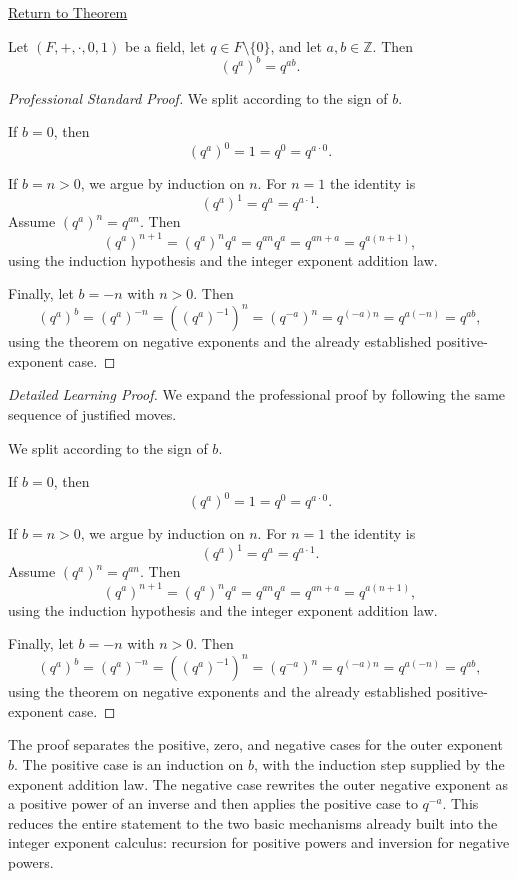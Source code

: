 \newpage
{}
\label{prf:power-of-a-power-in-field}

\begin{remark*}[Return]
\hyperref[thm:power-of-a-power-in-field]{Return to Theorem}
\end{remark*}

\begin{theorem*}
Let $(F,+,\cdot,0,1)$ be a field, let $q\in F\setminus\{0\}$, and let
$a,b\in\mathbb{Z}$. Then
\[
(q^a)^b=q^{ab}.
\]
\end{theorem*}

\begin{proof}[Professional Standard Proof]
\LRAProofBodyStart
We split according to the sign of $b$.

If $b=0$, then
\[
(q^a)^0=1=q^0=q^{a\cdot 0}.
\]

If $b=n>0$, we argue by induction on $n$.  For $n=1$ the identity is
\[
(q^a)^1=q^a=q^{a\cdot 1}.
\]
Assume $(q^a)^n=q^{an}$.  Then
\[
(q^a)^{n+1}=(q^a)^n q^a=q^{an}q^a=q^{an+a}=q^{a(n+1)},
\]
using the induction hypothesis and the integer exponent addition law.

Finally, let $b=-n$ with $n>0$.  Then
\[
(q^a)^b=(q^a)^{-n}=((q^a)^{-1})^n=(q^{-a})^n=q^{(-a)n}=q^{a(-n)}=q^{ab},
\]
using the theorem on negative exponents and the already established
positive-exponent case.
\end{proof}

\begin{proof}[Detailed Learning Proof]
\LRAProofBodyStart
We expand the professional proof by following the same sequence of justified moves.

We split according to the sign of $b$.

If $b=0$, then
\[
(q^a)^0=1=q^0=q^{a\cdot 0}.
\]

If $b=n>0$, we argue by induction on $n$.  For $n=1$ the identity is
\[
(q^a)^1=q^a=q^{a\cdot 1}.
\]
Assume $(q^a)^n=q^{an}$.  Then
\[
(q^a)^{n+1}=(q^a)^n q^a=q^{an}q^a=q^{an+a}=q^{a(n+1)},
\]
using the induction hypothesis and the integer exponent addition law.

Finally, let $b=-n$ with $n>0$.  Then
\[
(q^a)^b=(q^a)^{-n}=((q^a)^{-1})^n=(q^{-a})^n=q^{(-a)n}=q^{a(-n)}=q^{ab},
\]
using the theorem on negative exponents and the already established
positive-exponent case.
\end{proof}

\begin{remark*}
The proof separates the positive, zero, and negative cases for the outer
exponent $b$.  The positive case is an induction on $b$, with the induction
step supplied by the exponent addition law.  The negative case rewrites the
outer negative exponent as a positive power of an inverse and then applies
the positive case to $q^{-a}$.  This reduces the entire statement to the two
basic mechanisms already built into the integer exponent calculus: recursion
for positive powers and inversion for negative powers.
\end{remark*}

